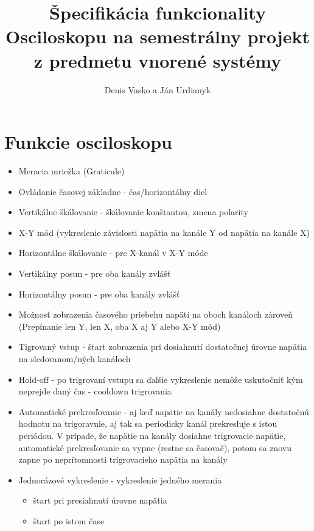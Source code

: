 \documentclass{article}
\begin{document}
	\title{Špecifikácia funkcionality Osciloskopu na semestrálny projekt z predmetu vnorené systémy}
	\author{Denis Vasko a Ján Urdianyk} 
	\maketitle
	\thispagestyle{empty}
	\newpage
	
	
	\tableofcontents
	\listoffigures
	\listoftables
	\newpage
	
\section{Funkcie osciloskopu}
\begin{itemize}
	\item Meracia mriežka (Graticule) 
	\item Ovládanie časovej základne - čas/horizontálny diel
	\item Vertikálne škálovanie - škálovanie konštantou, zmena polarity
	\item X-Y mód (vykreslenie závislosti napätia na kanále Y od napätia na kanále X)
	\item Horizontálne škálovanie - pre X-kanál v X-Y móde
	\item Vertikálny posun - pre oba kanály zvlášť
	\item Horizontálny posun - pre oba kanály zvlášť
	\item Možnosť zobrazenia časového priebehu napätí na oboch kanáloch zároveň (Prepínanie len Y, len X, oba X aj Y alebo X-Y mód)
	\item Tigrovaný vstup - štart zobrazenia pri dosiahnutí dostatočnej úrovne napätia na sledovanom/ných kanáloch
	\item Hold-off - po trigrovaní vstupu sa ďalšie vykreslenie nemôže uskutočniť kým neprejde daný čas - cooldown trigrovania
	\item Automatické prekresľovanie - aj keď napätie na kanály nedosiahne dostatočnú hodnotu na trigoravnie, aj tak sa periodicky kanál prekresľuje s istou periódou. V prípade, že napätie na kanály dosiahne trigrovacie napätie, automatické prekresľovanie sa vypne (restne sa časovač), potom sa znovu zapne po neprítomnosti trigrovacieho napätia na kanály
	\item Jednorázové vykreslenie - vykreslenie jedného merania 
	\begin{itemize}
		\item štart pri presiahnutí úrovne napätia
		\item štart po istom čase 
	\end{itemize}
\end{itemize} 
\end{document}
